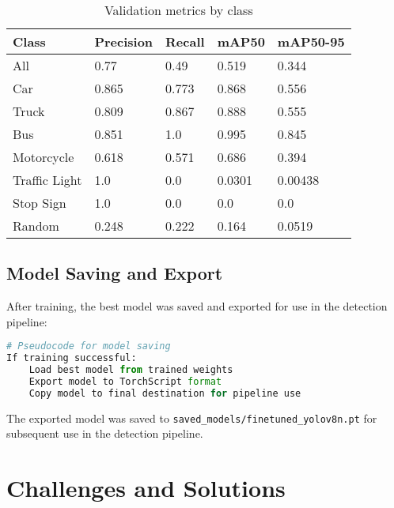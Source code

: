 \documentclass[9pt,a4paper,twoside]{rho-class/rho}
\begin{document}
    \begin{table}[h]
        \centering
        \caption{Validation metrics by class}
        \label{tab:validation}
        \begin{tabular}{lllll}
            \toprule
            \textbf{Class} & \textbf{Precision} & \textbf{Recall} & \textbf{mAP50} & \textbf{mAP50-95} \\
            \midrule
            All           & 0.77  & 0.49  & 0.519  & 0.344    \\
            Car           & 0.865 & 0.773 & 0.868  & 0.556    \\
            Truck         & 0.809 & 0.867 & 0.888  & 0.555    \\
            Bus           & 0.851 & 1.0   & 0.995  & 0.845    \\
            Motorcycle    & 0.618 & 0.571 & 0.686  & 0.394    \\
            Traffic Light & 1.0   & 0.0   & 0.0301 & 0.00438  \\
            Stop Sign     & 1.0   & 0.0   & 0.0    & 0.0      \\
            Random        & 0.248 & 0.222 & 0.164  & 0.0519   \\
            \bottomrule
        \end{tabular}
    \end{table}
    
    \subsection{Model Saving and Export}
    
    After training, the best model was saved and exported for use in the detection pipeline:
    
    \begin{lstlisting}[caption=Pseudocode for model saving, language=Python]
# Pseudocode for model saving
If training successful:
    Load best model from trained weights
    Export model to TorchScript format
    Copy model to final destination for pipeline use
    \end{lstlisting}
    
    The exported model was saved to \texttt{saved\_models/finetuned\_yolov8n.pt} for subsequent use in the detection pipeline.
\newpage
\section{Challenges and Solutions}
\end{document}
